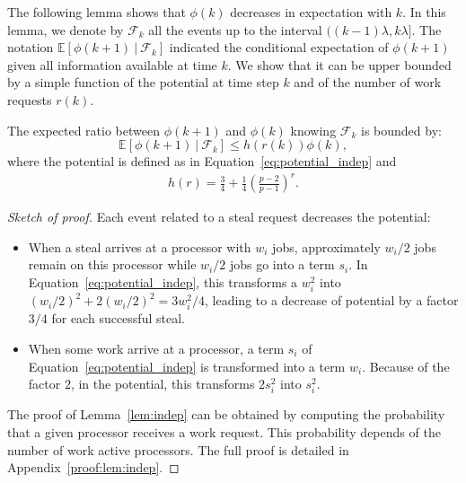 The following lemma shows that $\phi(k)$ decreases in expectation with
$k$. In this lemma, we denote by $\mathcal{F}_{k}$ all the events up to the interval
$((k-1)\lambda, k\lambda]$. The notation $ \mathbb{E}[\phi(k+1) \:|\:
\mathcal{F}_{k}]$ indicated the conditional expectation of $\phi(k+1)$
given all information available at time $k$. We show that it can be
upper bounded by a simple function of the potential at time step $k$
and of the number of work requests $r(k)$. 
\begin{lemma}
  \label{lem:indep}
  The expected ratio between $\phi(k+1)$ and $\phi(k)$ knowing
  $\mathcal{F}_{k}$ is bounded by:
  \begin{equation*}
    \mathbb{E}[\phi(k+1) \:|\: \mathcal{F}_{k}] \leq
    h(r(k))\phi(k),
  \end{equation*}
  where the potential is defined as in
  Equation~\eqref{eq:potential_indep} and
  \begin{align}
    \label{eq:h}
    h(r)=\frac34 + \frac14 \left(\frac{p-2}{p-1} \right)^{r}.
  \end{align}
  
\end{lemma}

\begin{proof}[Sketch of proof]
  Each event related to a steal request decreases the potential:
  \begin{itemize}
  \item When a steal arrives at a processor with $w_i$ jobs,
    approximately $w_i/2$ jobs remain on this processor while $w_i/2$
    jobs go into a term $s_i$. In Equation~\eqref{eq:potential_indep},
    this transforms a $w_i^2$ into $(w_i/2)^2+2(w_i/2)^2=3w_i^2/4$,
    leading to a decrease of potential by a factor $3/4$ for each
    successful steal.
  \item When some work arrive at a processor, a term $s_i$ of
    Equation~\eqref{eq:potential_indep} is transformed into a term
    $w_i$. Because of the factor $2$, in the potential, this
    transforms $2s_i^2$ into $s_i^2$.
  \end{itemize}
  
  The proof of Lemma~\ref{lem:indep} can be obtained by computing the
  probability that a given processor receives a work request. This
  probability depends of the number of work active processors.  The
  full proof is detailed in Appendix~\ref{proof:lem:indep}.
\end{proof}

